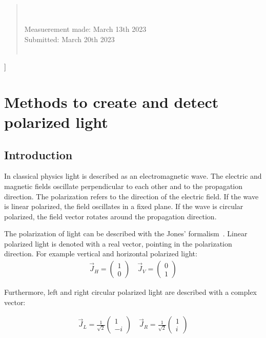 \documentclass[a4paper,10pt,twocolumn]{article}
\begin{document}
{\begin{abstract}
        \\
        \\
        Measuerement made: March 13th 2023\\       %
        Submitted: March 20th 2023                %
        \\
        \\
    \end{abstract}
    }] 
    \section{Methods to create and detect polarized light}
    \subsection{Introduction}
    In classical physics light is described as an electromagnetic wave.
    The electric and magnetic fields oscillate perpendicular to each other and to the propagation direction.
    The polarization refers to the direction of the electric field.
    If the wave is linear polarized, the field oscillates in a fixed plane.
    If the wave is circular polarized, the field vector rotates around the propagation direction.
    
    The polarization of light can be described with the Jones' formalism~\cite{gerth}.
    Linear polarized light is denoted with a real vector, pointing in the polarization direction.
    For example vertical and horizontal polarized light:
    \begin{align*}
        \vec{J}_H = \begin{pmatrix} 1 \\ 0 \end{pmatrix} \quad
        \vec{J}_V = \begin{pmatrix} 0 \\ 1 \end{pmatrix}
    \end{align*}
    
    Furthermore, left and right circular polarized light are described with a complex vector:

    \begin{align*}
        \vec{J}_L = \frac{1}{\sqrt {2}} \begin{pmatrix} 1 \\ -i \end{pmatrix} \quad
        \vec{J}_R = \frac{1}{\sqrt {2}} \begin{pmatrix} 1 \\ i \end{pmatrix}
    \end{align*}
    
\end{document}
